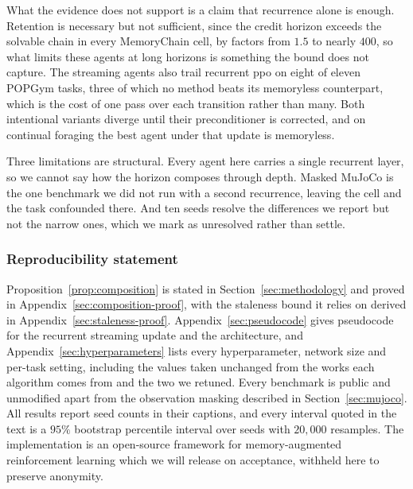 \documentclass{article}
\begin{document}
What the evidence does not support is a claim that recurrence alone is enough. Retention is
necessary but not sufficient, since the credit horizon exceeds the solvable chain in every
MemoryChain cell, by factors from $1.5$ to nearly $400$, so what limits these agents at long
horizons is something the bound does not capture. The streaming agents also trail recurrent
\gls{ppo} on eight of eleven POPGym tasks, three of which no method beats its memoryless
counterpart, which is the cost of one pass over each transition rather than many. Both
intentional variants diverge until their preconditioner is corrected, and on continual foraging
the best agent under that update is memoryless.

Three limitations are structural. Every agent here carries a single recurrent layer, so we cannot
say how the horizon composes through depth. Masked MuJoCo is the one benchmark we did not run
with a second recurrence, leaving the cell and the task confounded there. And ten seeds resolve
the differences we report but not the narrow ones, which we mark as unresolved rather than
settle.


\newpage

\subsubsection*{Reproducibility statement}

Proposition~\ref{prop:composition} is stated in Section~\ref{sec:methodology} and proved in
Appendix~\ref{sec:composition-proof}, with the staleness bound it relies on derived in
Appendix~\ref{sec:staleness-proof}. Appendix~\ref{sec:pseudocode} gives pseudocode for the
recurrent streaming update and the architecture, and Appendix~\ref{sec:hyperparameters} lists
every hyperparameter, network size and per-task setting, including the values taken unchanged
from the works each algorithm comes from and the two we retuned. Every benchmark is public and
unmodified apart from the observation masking described in Section~\ref{sec:mujoco}. All results
report seed counts in their captions, and every interval quoted in the text is a $95\%$
bootstrap percentile interval over seeds with $20{,}000$ resamples. The implementation is an
open-source framework for memory-augmented reinforcement learning which we will release on
acceptance, withheld here to preserve anonymity.
\end{document}

